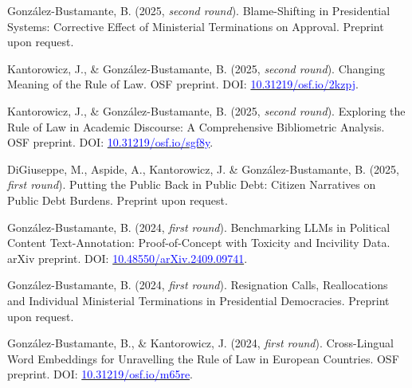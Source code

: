 \begin{publications}

\begin{benumerate}{8}

\item{González-Bustamante, B. (2025, {\itshape second round}). Blame-Shifting in Presidential Systems: Corrective Effect of Ministerial Terminations on Approval. Preprint upon request.}\vspace{1mm}

\item{Kantorowicz, J., \& González-Bustamante, B. (2025, {\itshape second round}). Changing Meaning of the Rule of Law. OSF preprint. DOI: \href{https://doi.org/10.31219/osf.io/2kzpj}{\textcolor{blue}{10.31219/osf.io/2kzpj}}.}\vspace{1mm}

\item{Kantorowicz, J., \& González-Bustamante, B. (2025, {\itshape second round}). Exploring the Rule of Law in Academic Discourse: A Comprehensive Bibliometric Analysis. OSF preprint. DOI: \href{https://doi.org/10.31219/osf.io/sgf8y}{\textcolor{blue}{10.31219/osf.io/sgf8y}}.}\vspace{1mm}

\item{DiGiuseppe, M., Aspide, A., Kantorowicz, J. \& González-Bustamante, B. (2025, {\itshape first round}). Putting the Public Back in Public Debt: Citizen Narratives on Public Debt Burdens. Preprint upon request.}\vspace{1mm}

\item{González-Bustamante, B. (2024, {\itshape first round}). Benchmarking LLMs in Political Content Text-Annotation: Proof-of-Concept with Toxicity and Incivility Data. arXiv preprint. DOI: \href{https://doi.org/10.48550/arXiv.2409.09741}{\textcolor{blue}{10.48550/arXiv.2409.09741}}.}\vspace{1mm}

\item{González-Bustamante, B. (2024, {\itshape first round}). Resignation Calls, Reallocations and Individual Ministerial Terminations in Presidential Democracies. Preprint upon request.}\vspace{1mm} %

\item{González-Bustamante, B., \& Kantorowicz, J. (2024, {\itshape first round}). Cross-Lingual Word Embeddings for Unravelling the Rule of Law in European Countries. OSF preprint. DOI: \href{https://doi.org/10.31219/osf.io/m65re}{\textcolor{blue}{10.31219/osf.io/m65re}}.}\vspace{1mm}


\end{benumerate}
\end{publications}
